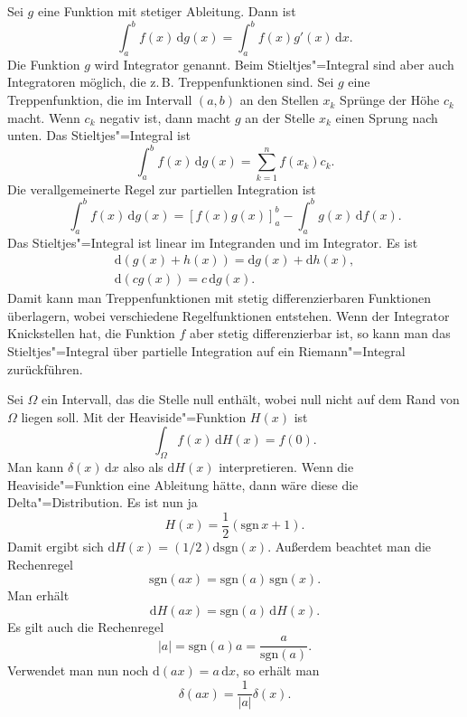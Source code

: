 \documentclass[a4paper,11pt,fleqn,twocolumn,twoside]{scrartcl}
\numberwithin{equation}{section}
\begin{document}
Sei $g$ eine Funktion mit stetiger Ableitung. Dann ist
\begin{equation}
\int_a^b f(x)\,\mathrm dg(x) = \int_a^b f(x)g'(x)\,\mathrm dx.
\end{equation}
Die Funktion $g$ wird Integrator genannt. Beim Stieltjes"=Integral
sind aber auch Integratoren möglich, die z.\,B. Treppenfunktionen sind.
Sei $g$ eine Treppenfunktion, die im Intervall $(a,b)$ an den
Stellen $x_k$ Sprünge der Höhe $c_k$ macht. Wenn $c_k$ negativ
ist, dann macht $g$ an der Stelle $x_k$ einen Sprung nach unten.
Das Stieltjes"=Integral ist
\begin{equation}
\int_a^b f(x)\,\mathrm dg(x) = \sum_{k=1}^n f(x_k)c_k.
\end{equation}
Die verallgemeinerte Regel zur partiellen Integration ist
\[\int_a^b f(x)\,\mathrm dg(x) = [f(x)g(x)]_a^b - \int_a^b g(x)\,\mathrm df(x).\]
Das Stieltjes"=Integral ist linear im Integranden und im Integrator.
Es ist
\begin{gather}
\mathrm d(g(x)+h(x)) = \mathrm dg(x)+\mathrm dh(x),\\
\mathrm d(cg(x)) = c\,\mathrm dg(x).
\end{gather}
Damit kann man Treppenfunktionen mit stetig differenzierbaren
Funktionen überlagern, wobei verschiedene Regelfunktionen entstehen.
Wenn der Integrator Knickstellen hat, die Funktion $f$ aber stetig
differenzierbar ist, so kann man das Stieltjes"=Integral über
partielle Integration auf ein Riemann"=Integral zurückführen.

Sei $\Omega$ ein Intervall, das die Stelle null enthält, wobei
null nicht auf dem Rand von $\Omega$ liegen soll. Mit der
Heaviside"=Funktion $H(x)$ ist
\begin{equation}
\int_{\Omega} f(x)\,\mathrm dH(x) = f(0).
\end{equation}
Man kann $\delta(x)\,\mathrm dx$ also als $\mathrm dH(x)$
interpretieren. Wenn die Heaviside"=Funktion eine Ableitung hätte,
dann wäre diese die Delta"=Distribution. Es ist nun ja
\begin{equation}
H(x) = \frac{1}{2}(\mathrm{sgn}\,x+1).
\end{equation}
Damit ergibt sich $\mathrm dH(x) = (1/2)\mathrm d\mathrm{sgn}(x)$.
Außerdem beachtet man die Rechenregel
\begin{equation}
\mathrm{sgn}(ax) = \mathrm{sgn}(a)\,\mathrm{sgn}(x).
\end{equation}
Man erhält
\begin{equation}
\mathrm dH(ax) = \mathrm{sgn}(a)\,\mathrm dH(x).
\end{equation}
Es gilt auch die Rechenregel
\begin{equation}
|a| = \mathrm{sgn}(a)a = \frac{a}{\mathrm{sgn}(a)}.
\end{equation}
Verwendet man nun noch $\mathrm d(ax) = a\,\mathrm dx$,
so erhält man
\begin{equation}
\delta(ax) = \frac{1}{|a|}\delta(x).
\end{equation}
\end{document}
